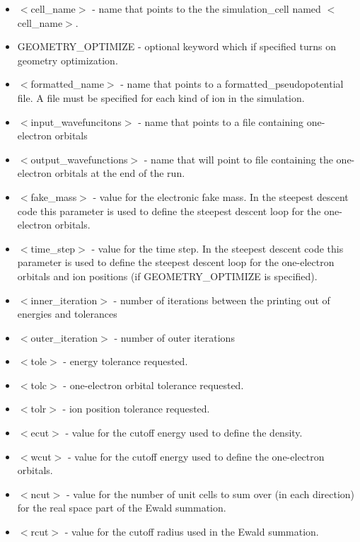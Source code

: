 \begin{itemize}
	\item $<$cell\_name$>$ - name that points to the
              the simulation\_cell named $<$cell\_name$>$.
	\item GEOMETRY\_OPTIMIZE - optional keyword which if specified
	      turns on geometry optimization. 	
	\item $<$formatted\_name$>$ - name that points
              to a formatted\_pseudopotential file.  A file must
              be specified for each kind of ion in the simulation.
	\item $<$input\_wavefuncitons$>$ - name that points
              to a file containing one-electron orbitals
	\item $<$output\_wavefunctions$>$ - name that will
              point to file containing the one-electron orbitals at the
              end of the run. 
	\item $<$fake\_mass$>$ - value for the electronic
              fake mass.  In the steepest descent code this parameter is
              used to define the steepest descent loop for the one-electron
              orbitals.
	\item $<$time\_step$>$ - value for the time step.
               In the steepest descent code this parameter is used to
               define the steepest descent loop for the one-electron orbitals
               and ion positions (if GEOMETRY\_OPTIMIZE is specified).
	\item $<$inner\_iteration$>$ - number of iterations between the 
              printing out of energies and tolerances
	\item $<$outer\_iteration$>$ - number of outer iterations
 	\item $<$tole$>$ - energy tolerance requested.
	\item $<$tolc$>$ - one-electron orbital tolerance requested.
	\item $<$tolr$>$ - ion position tolerance requested.
	\item $<$ecut$>$ - value for the cutoff energy used
                           to define the density.
	\item $<$wcut$>$ - value for the cutoff energy used
 			   to define the one-electron orbitals.
	\item $<$ncut$>$ - value for the number of unit cells
 			  to sum over (in each direction) for the real space
			  part of the Ewald summation.
	\item $<$rcut$>$ - value for the cutoff radius used
			  in the Ewald summation.
\end{itemize}



